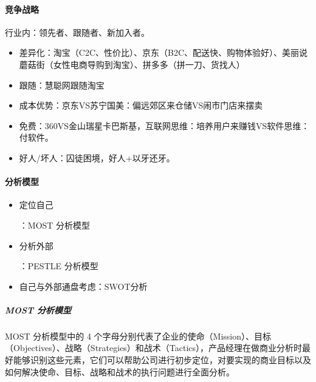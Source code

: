 \documentclass[letterpaper,11pt,english]{sphinxmanual}
\begin{document}
\paragraph{竞争战略}
\label{\detokenize{chapter_knowledge/compete_analysis:id6}}
行业内：领先者、跟随者、新加入者。
\begin{itemize}
\item {} 
差异化：淘宝（C2C、性价比）、京东（B2C、配送快、购物体验好）、美丽说蘑菇街（女性电商导购到淘宝）、拼多多（拼一刀、货找人）

\item {} 
跟随：慧聪网跟随淘宝

\item {} 
成本优势：京东VS苏宁国美：偏远郊区来仓储VS闹市门店来摆卖

\item {} 
免费：360VS金山瑞星卡巴斯基，互联网思维：培养用户来赚钱VS软件思维：付软件。

\item {} 
好人/坏人：囚徒困境，好人+以牙还牙。

\end{itemize}


\paragraph{分析模型}
\label{\detokenize{chapter_knowledge/compete_analysis:id7}}\begin{itemize}
\item {} 
定位自己
%
\begin{footnote}[477]\sphinxAtStartFootnote
{}
%
\end{footnote}：MOST
分析模型

\item {} 
分析外部
%
\begin{footnote}[478]\sphinxAtStartFootnote
{}
%
\end{footnote}：PESTLE
分析模型

\item {} 
自己与外部通盘考虑：SWOT分析

\end{itemize}


\subparagraph{MOST 分析模型}
\label{\detokenize{chapter_knowledge/compete_analysis:most}}
MOST 分析模型中的 4
个字母分别代表了企业的使命（Mission）、目标（Objectives）、战略（Strategies）和战术（Tactics），产品经理在做商业分析时最好能够识别这些元素，它们可以帮助公司进行初步定位，对要实现的商业目标以及如何解决使命、目标、战略和战术的执行问题进行全面分析。
\end{document}
